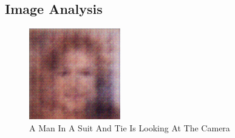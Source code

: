 \documentclass{article}%
\begin{document}
%
\subsection{Image Analysis}%
\label{subsec:ImageAnalysis}%


\begin{figure}[h!]%
\centering%
\includegraphics[width=150px]{500_fake_images/samples_5_262.png}%
\caption{A Man In A Suit And Tie Is Looking At The Camera}%
\end{figure}

%
\end{document}
